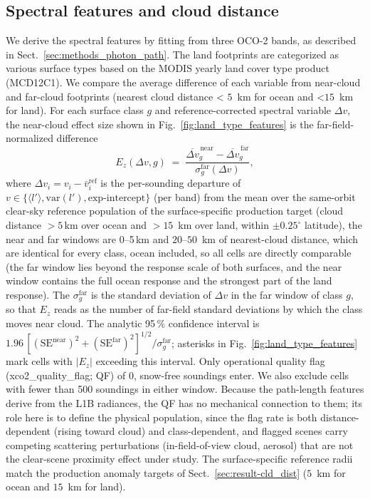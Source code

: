 \subsection{Spectral features and cloud distance}
\label{sec:result-spec_anal}


We derive the spectral features by fitting from three OCO-2 bands, as described in Sect.~\ref{sec:methods_photon_path}. The land footprints are categorized as various surface types based on the MODIS yearly land cover type product (MCD12C1). We compare the average difference of each variable from near-cloud and far-cloud footprints (nearest cloud distance < $5$~km for ocean and <$15$~km for land). For each surface class $g$ and reference-corrected spectral variable
$\Delta v$, the near-cloud effect size shown in Fig.~\ref{fig:land_type_features} is the
far-field-normalized difference
%
\begin{equation}
  E_z(\Delta v, g) \;=\;
  \frac{\overline{\Delta v}_{g}^{\,\mathrm{near}}
       - \overline{\Delta v}_{g}^{\,\mathrm{far}}}
       {\sigma_{g}^{\mathrm{far}}(\Delta v)} ,
  \label{eq:effect-size}
\end{equation}
%
where $\Delta v_i = v_i - \bar{v}_i^{\mathrm{ref}}$ is the per-sounding departure of $v \in \{\langle l'\rangle, \mathrm{var}(l'), \text{exp-intercept}\}$ (per band) from the mean over the same-orbit clear-sky reference population of the surface-specific production target (cloud distance $> 5$\,km over ocean
and $> 15$~km over land, within $\pm 0.25^{\circ}$ latitude), the near and far windows are 0--5\,km and $20$--$50$~km of nearest-cloud distance, which are identical for every class, ocean included, so all cells are directly comparable (the far window lies beyond the response scale of both surfaces, and the near window contains the full ocean response and the strongest part of the land response). The $\sigma_{g}^{\mathrm{far}}$ is the standard deviation of $\Delta v$ in the far window of class $g$, so that $E_z$ reads as the number of far-field standard deviations by which the class
moves near cloud. The analytic 95\,\% confidence interval is $1.96\,[(\mathrm{SE}^{\mathrm{near}})^2 +
(\mathrm{SE}^{\mathrm{far}})^2]^{1/2} / \sigma_{g}^{\mathrm{far}}$;
asterisks in Fig.~\ref{fig:land_type_features} mark cells with $|E_z|$ exceeding this interval. Only
operational quality flag (xco2\_quality\_flag; QF) of 0, snow-free soundings enter. We also exclude cells with fewer than 500 soundings in either window. Because the path-length features derive from the L1B radiances, the QF has no mechanical connection to them; its role here is to define the physical population, since the flag rate is both distance-dependent (rising toward cloud) and class-dependent, and flagged scenes carry competing scattering perturbations (in-field-of-view cloud, aerosol) that are not the clear-scene proximity effect under study. The surface-specific reference radii match the production anomaly targets of Sect.~\ref{sec:result-cld_dist} ($5$~km for ocean and $15$~km for land).




